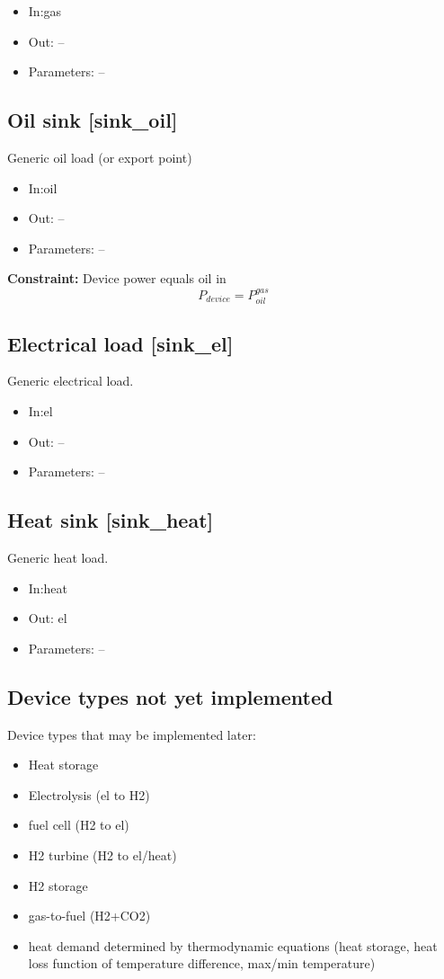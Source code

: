 \documentclass[12pt]{article}
\begin{document}
\begin{itemize}
\item In:gas
\item Out: --
\item Parameters: --
\end{itemize}


\subsection{Oil sink [sink\_oil]}

Generic oil load (or export point)

\begin{itemize}
\item In:oil
\item Out: --
\item Parameters: --
\end{itemize}


\textbf{Constraint:}
Device power equals oil in
 \[ P_{device}=P_{oil}^{gas} \] 


\subsection{Electrical load [sink\_el]}

Generic electrical load.

\begin{itemize}
\item In:el
\item Out: --
\item Parameters: --
\end{itemize}



\subsection{Heat sink [sink\_heat]}

Generic heat load.

\begin{itemize}
\item In:heat
\item Out: el
\item Parameters: --
\end{itemize}


\subsection{Device types not yet implemented}
Device types that may be implemented later:
\begin{itemize}
	\item Heat storage
	\item Electrolysis (el to H2)
	\item fuel cell (H2 to el)
	\item H2 turbine (H2 to el/heat)
	\item H2 storage
	\item gas-to-fuel (H2+CO2)
	\item heat demand determined by thermodynamic equations (heat storage, heat loss function of temperature difference, max/min temperature)
\end{itemize}
\end{document}
